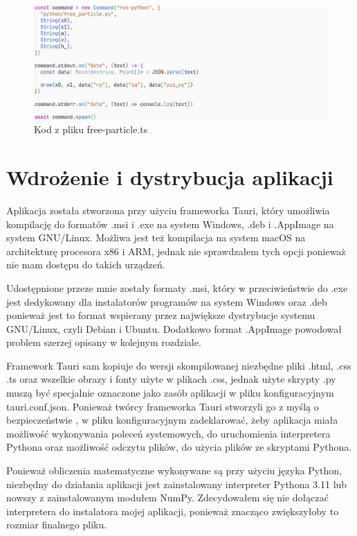 \documentclass{SGGW-thesis}
\begin{document}
	\begin{figure}[H]
	\includegraphics[width=\textwidth,height=\textheight,keepaspectratio]{ts run python.png} 
	\caption{Kod z pliku free-particle.ts}	
	\label{fig:ts-run-python}
	\end{figure}
	
	
	\section{Wdrożenie i dystrybucja aplikacji}
	Aplikacja została stworzona przy użyciu frameworka Tauri, który umożliwia kompilację do formatów .msi i .exe na system Windows, .deb i .AppImage na system GNU/Linux. Możliwa jest też kompilacja na system macOS na architekturę procesora x86 i ARM, jednak nie sprawdzałem tych opcji ponieważ nie mam dostępu do takich urządzeń.
	
	Udostępnione przeze mnie zostały formaty .msi, który w przeciwieństwie do .exe jest dedykowany dla instalatorów programów na system Windows oraz .deb ponieważ jest to format wspierany przez największe dystrybucje systemu GNU/Linux, czyli Debian i Ubuntu. Dodatkowo format .AppImage powodował problem szerzej opisany w kolejnym rozdziale. 
	
	Framework Tauri sam kopiuje do wersji skompilowanej niezbędne pliki .html, .css .ts oraz wszelkie obrazy i fonty użyte w plikach .css, jednak użyte skrypty .py muszą być specjalnie oznaczone jako zasób aplikacji w pliku konfiguracyjnym tauri.conf.json. Ponieważ twórcy frameworka Tauri stworzyli go z myślą o bezpieczeństwie \cite{about-tauri}, w pliku konfiguracyjnym zadeklarować, żeby aplikacja miała możliwość wykonywania poleceń systemowych, do uruchomienia interpretera Pythona oraz możliwość odczytu plików, do użycia plików ze skryptami Pythona.
	
	Ponieważ obliczenia matematyczne wykonywane są przy użyciu języka Python, niezbędny do działania aplikacji jest zainstalowany interpreter Pythona 3.11 lub nowszy z zainstalowanym modułem NumPy. Zdecydowałem się nie dołączać interpretera do instalatora mojej aplikacji, ponieważ znacząco zwiększyłoby to rozmiar finalnego pliku. 
\end{document}
